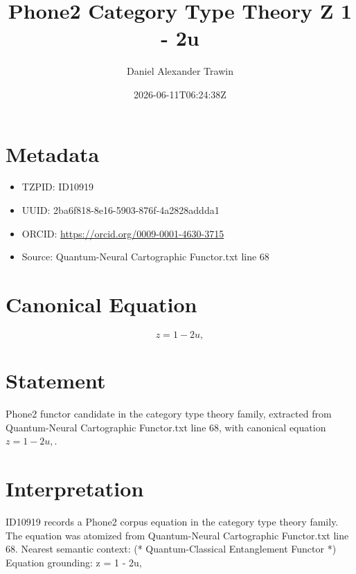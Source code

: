 \documentclass[11pt]{article}
\title{Phone2 Category Type Theory Z 1 - 2u}
\author{Daniel Alexander Trawin}
\date{2026-06-11T06:24:38Z}
\begin{document}
\maketitle
\section*{Metadata}
\begin{itemize}
\item TZPID: ID10919
\item UUID: 2ba6f818-8e16-5903-876f-4a2828addda1
\item ORCID: \url{https://orcid.org/0009-0001-4630-3715}
\item Source: Quantum-Neural Cartographic Functor.txt line 68
\end{itemize}
\section*{Canonical Equation}
\[
z = 1 - 2u,
\]
\section*{Statement}
Phone2 functor candidate in the category type theory family, extracted from Quantum-Neural Cartographic Functor.txt line 68, with canonical equation $z = 1 - 2u,$.
\section*{Interpretation}
ID10919 records a Phone2 corpus equation in the category type theory family. The equation was atomized from Quantum-Neural Cartographic Functor.txt line 68. Nearest semantic context: (* Quantum-Classical Entanglement Functor *) Equation grounding: z = 1 - 2u,
\end{document}
